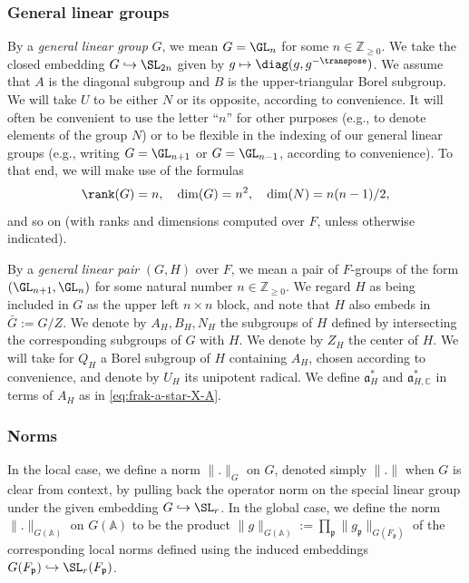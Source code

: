 \subsubsection{General linear groups}\label{sec:gener-line-groups-1}
By a \emph{general linear group} $G$, we mean $G = \GL_n$ for some $n \in \mathbb{Z}_{\geq 0}$.  We take the closed embedding $G \hookrightarrow \SL_{2 n}$ given by $g \mapsto \diag(g, g^{-\transpose})$.  We assume that $A$ is the diagonal subgroup and $B$ is the upper-triangular Borel subgroup.  We will take $U$ to be either $N$ or its opposite, according to convenience.  It will often be convenient to use the letter ``$n$'' for other purposes (e.g., to denote elements of the group $N$) or to be flexible in the indexing of our general linear groups (e.g., writing $G = \GL_{n+1}$ or $G = \GL_{n-1}$, according to convenience).  To that end, we will make use of the formulas
\begin{equation*}
  \rank(G) = n, \quad \dim(G) = n^2, \quad
  \dim(N) = n(n-1)/2,
\end{equation*}
and so on (with ranks and dimensions computed over $F$, unless otherwise indicated).

By a \emph{general linear pair} $(G,H)$ over $F$, we mean a pair of $F$-groups of the form $(\GL_{n+1},\GL_n)$ for some natural number $n \in \mathbb{Z}_{\geq 0}$.  We regard $H$ as being included in $G$ as the upper left $n \times n$ block, and note that $H$ also embeds in $\bar{G} := G / Z$.  We denote by $A_H, B_H, N_H$ the subgroups of $H$ defined by intersecting the corresponding subgroups of $G$ with $H$.  We denote by $Z_H$ the center of $H$.  We will take for $Q_H$ a Borel subgroup of $H$ containing $A_H$, chosen according to convenience, and denote by $U_H$ its unipotent radical.  We define $\mathfrak{a}_H^*$ and $\mathfrak{a}_{H,\mathbb{C}}^*$ in terms of $A_H$ as in \eqref{eq:frak-a-star-X-A}.


\subsubsection{Norms}
In the local case, we define a norm $\|.\|_G$ on $G$, denoted simply $\|.\|$ when $G$ is clear from context, by pulling back the operator norm on the special linear group under the given embedding $G \hookrightarrow \SL_r$.  In the global case, we define the norm $\|.\|_{G(\mathbb{A})}$ on $G(\mathbb{A})$ to be the product $\|g\|_{G(\mathbb{A})} := \prod_{\mathfrak{p}} \|g_\mathfrak{p} \|_{G(F_\mathfrak{p})}$ of the corresponding local norms defined using the induced embeddings $G(F_\mathfrak{p}) \hookrightarrow \SL_r(F_\mathfrak{p})$.


